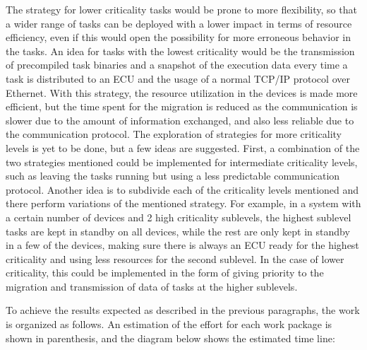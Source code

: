 The strategy for lower criticality tasks would be prone to more flexibility, so that a wider range of tasks can be deployed with a lower impact in terms of resource efficiency, even if this would open the possibility for more erroneous behavior in the tasks. An idea for tasks with the lowest criticality would be the transmission of precompiled task binaries and a snapshot of the execution data every time a task is distributed to an ECU and the usage of a normal TCP/IP protocol over Ethernet. With this strategy, the resource utilization in the devices is made more efficient, but the time spent for the migration is reduced as the communication is slower due to the amount of information exchanged, and also less reliable due to the communication protocol. The exploration of strategies for more criticality levels is yet to be done, but a few ideas are suggested. First, a combination of the two strategies mentioned could be implemented for intermediate criticality levels, such as leaving the tasks running but using a less predictable communication protocol. Another idea is to subdivide each of the criticality levels mentioned and there perform variations of the mentioned strategy. For example, in a system with a certain number of devices and 2 high criticality sublevels, the highest sublevel tasks are kept in standby on all devices, while the rest are only kept in standby in a few of the devices, making sure there is always an ECU ready for the highest criticality and using less resources for the second sublevel. In the case of lower criticality, this could be implemented in the form of giving priority to the migration and transmission of data of tasks at the higher sublevels.

To achieve the results expected as described in the previous paragraphs, the work is organized as follows. An estimation of the effort for each work package is shown in parenthesis, and the diagram below shows the estimated time line:

